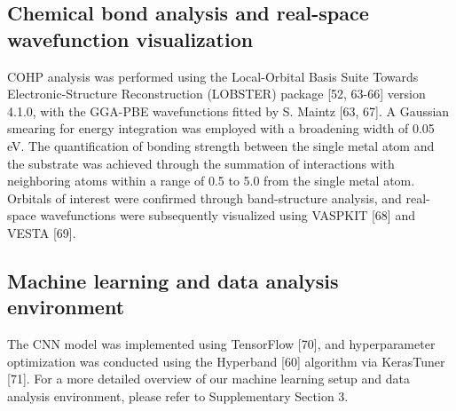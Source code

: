 \subsection{Chemical bond analysis and real-space wavefunction visualization}
COHP analysis was performed using the Local-Orbital Basis Suite Towards Electronic-Structure Reconstruction (LOBSTER) package  [52, 63-66] version 4.1.0, with the GGA-PBE wavefunctions fitted by S. Maintz [63, 67].
A Gaussian smearing for energy integration was employed with a broadening width of 0.05 eV.
The quantification of bonding strength between the single metal atom and the substrate was achieved through the summation of interactions with neighboring atoms within a range of 0.5 \text{\AA} to 5.0 \text{\AA} from the single metal atom.
Orbitals of interest were confirmed through band-structure analysis, and real-space wavefunctions were subsequently visualized using VASPKIT [68] and VESTA [69].


\subsection{Machine learning and data analysis environment}
The CNN model was implemented using TensorFlow [70], and hyperparameter optimization was conducted using the Hyperband [60] algorithm via KerasTuner [71].
For a more detailed overview of our machine learning setup and data analysis environment, please refer to Supplementary Section 3.
